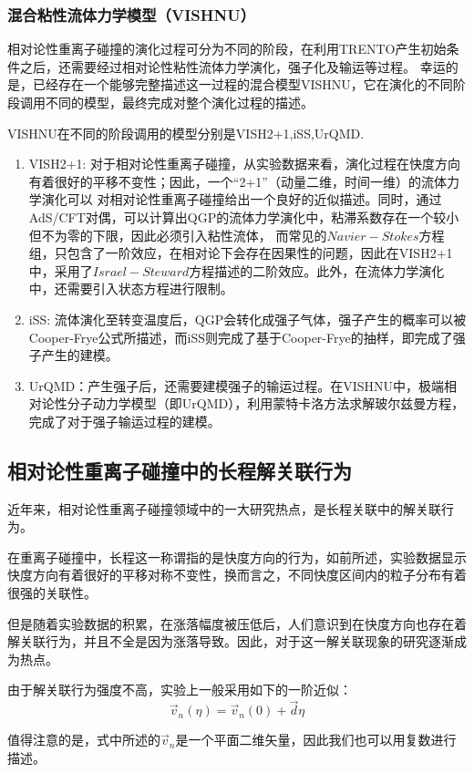 \documentclass[aps,pre,12pt,preprint,onecolumn,showpacs,showkeys]{revtex4-1}
\begin{document}
\subsubsection{混合粘性流体力学模型（VISHNU）}
相对论性重离子碰撞的演化过程可分为不同的阶段，在利用TRENTO产生初始条件之后，还需要经过相对论性粘性流体力学演化，强子化及输运等过程。
幸运的是，已经存在一个能够完整描述这一过程的混合模型VISHNU，它在演化的不同阶段调用不同的模型，最终完成对整个演化过程的描述。\par
VISHNU在不同的阶段调用的模型分别是VISH2+1,iSS,UrQMD.
\begin{enumerate}
    \item VISH2+1: 对于相对论性重离子碰撞，从实验数据来看，演化过程在快度方向有着很好的平移不变性；因此，一个“2+1”（动量二维，时间一维）的流体力学演化可以
    对相对论性重离子碰撞给出一个良好的近似描述。同时，通过AdS/CFT对偶，可以计算出QGP的流体力学演化中，粘滞系数存在一个较小但不为零的下限，因此必须引入粘性流体，
    而常见的$Navier-Stokes$方程组，只包含了一阶效应，在相对论下会存在因果性的问题，因此在VISH2+1中，采用了$Israel-Steward$方程描述的二阶效应。此外，在流体力学演化
    中，还需要引入状态方程进行限制。
    \item iSS: 流体演化至转变温度后，QGP会转化成强子气体，强子产生的概率可以被Cooper-Frye公式所描述，而iSS则完成了基于Cooper-Frye的抽样，即完成了强子产生的建模。
    \item UrQMD：产生强子后，还需要建模强子的输运过程。在VISHNU中，极端相对论性分子动力学模型（即UrQMD），利用蒙特卡洛方法求解玻尔兹曼方程，完成了对于强子输运过程的建模。
\end{enumerate}
\subsection{相对论性重离子碰撞中的长程解关联行为}
近年来，相对论性重离子碰撞领域中的一大研究热点，是长程关联中的解关联行为。\par
在重离子碰撞中，长程这一称谓指的是快度方向的行为，如前所述，实验数据显示快度方向有着很好的平移对称不变性，换而言之，不同快度区间内的粒子分布有着很强的关联性。\par
但是随着实验数据的积累，在涨落幅度被压低后，人们意识到在快度方向也存在着解关联行为，并且不全是因为涨落导致。因此，对于这一解关联现象的研究逐渐成为热点。\par
由于解关联行为强度不高，实验上一般采用如下的一阶近似：
\begin{equation}
    \vec{v}_n(\eta)=\vec{v}_n(0)+\vec{d}\eta\label{eq:decorr}
\end{equation}
\par
值得注意的是，式中所述的$\vec{v}_n$是一个平面二维矢量，因此我们也可以用复数进行描述。
\end{document}
